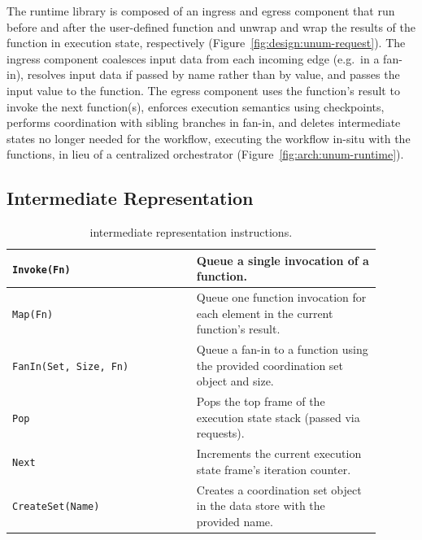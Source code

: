 
The runtime library is composed of an ingress and egress component that run
before and after the user-defined function and unwrap and wrap the results of
the function in \name{} execution state, respectively
(Figure~\ref{fig:design:unum-request}). The ingress component coalesces input
data from each incoming edge (e.g.\ in a fan-in), resolves input data if passed
by name rather than by value, and passes the input value to the function. The
egress component uses the function's result to invoke the next function(s),
enforces execution semantics using checkpoints, performs coordination with
sibling branches in fan-in, and deletes intermediate states no longer needed for
the workflow, executing the workflow in-situ with the functions, in lieu of a
centralized orchestrator (Figure~\ref{fig:arch:unum-runtime}).



\subsection{\name{} Intermediate Representation}\label{sec:design:ir}

\begin{table}[t]
  \centering
  \begin{tabular}{|m{0.45\linewidth}|m{0.45\linewidth}|}
    \hline
  \texttt{Invoke(Fn)} & Queue a single invocation of a function.\\
    \hline
  \texttt{Map(Fn)} & Queue one function invocation for each element in the current function's result.\\
    \hline
  \texttt{FanIn(Set, Size, Fn)} & Queue a fan-in to a function using the provided coordination set object and size.\\
    \hline
  \texttt{Pop} & Pops the top frame of the execution state stack (passed via \name{} requests). \\
    \hline
  \texttt{Next} & Increments the current execution state frame's iteration counter.\\
    \hline
  \texttt{CreateSet(Name)} & Creates a coordination set object in the data store with the provided name.\\
    \hline
  \end{tabular}
  \caption{\name{} intermediate representation instructions.}
  \label{table:design:irschema}
\end{table}

